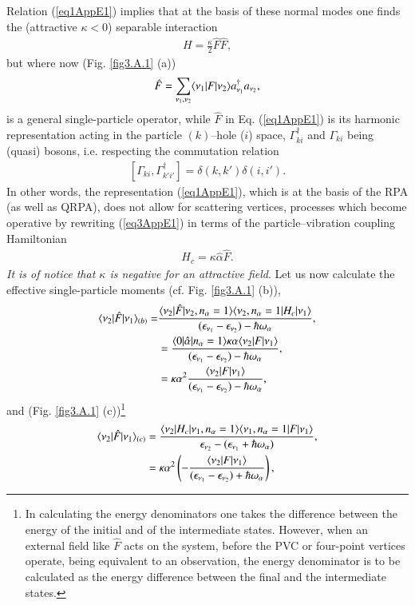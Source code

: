 Relation (\ref{eq1AppE1}) implies that at the basis of these normal modes one finds the (attractive $\kappa<0$) separable interaction 
\begin{align}\label{eq3AppE1}
H=\frac{\kappa}{2}\hat F\hat F,
\end{align}
but where now (Fig. \ref{fig3.A.1} (a))
\begin{align}
\hat F=\sum_{\nu_1,\nu_2} \langle {\nu_1|F|\nu_2} \rangle a^\dagger_{\nu_1}a_{\nu_2},
\end{align}
is a general single-particle operator, while $\hat F$ in  Eq. (\ref{eq1AppE1}) is its harmonic representation acting in the particle $(k)$--hole ($i$) space, $\Gamma^\dagger_{ki}$ and $\Gamma_{ki}$ being (quasi) bosons, i.e. respecting the commutation relation 
\begin{align}
\left[\Gamma_{ki},\Gamma^\dagger_{k'i'}\right]=\delta(k,k')\delta(i,i').
\end{align}
In other words, the representation (\ref{eq1AppE1}), which is at the basis of the RPA (as well as QRPA), does not allow for scattering vertices, processes which become operative by rewriting (\ref{eq3AppE1}) in terms of the particle--vibration coupling Hamiltonian
\begin{align}\label{eq3AppE4}
H_c=\kappa\hat \alpha\hat F.
\end{align}
\emph{It is of notice that $\kappa$ is negative for an attractive field}. Let us now calculate the effective single-particle moments (cf. Fig. \ref{fig3.A.1} (b)),
\begin{align}
\nonumber \langle {\nu_2|\hat F|\nu_1} \rangle_{(b)}=&\frac{\langle {\nu_2|\hat F|\nu_2,n_\alpha=1} \rangle\langle {\nu_2,n_\alpha=1|H_c|\nu_1} \rangle}{(\epsilon_{\nu_1}-\epsilon_{\nu_2})-\hbar\omega_\alpha},\\
\nonumber &=\frac{\langle {0|\hat \alpha|n_\alpha=1} \rangle\kappa\alpha \langle {\nu_2|F|\nu_1} \rangle}{(\epsilon_{\nu_1}-\epsilon_{\nu_2})-\hbar\omega_\alpha},\\
&=\kappa\alpha^2\frac{ \langle {\nu_2|F|\nu_1} \rangle}{(\epsilon_{\nu_1}-\epsilon_{\nu_2})-\hbar\omega_\alpha},
\end{align}
and (Fig. \ref{fig3.A.1} (c))\footnote{In calculating the energy denominators one takes the difference between the energy of the initial and of the intermediate states. However, when an external field like $\hat F$ acts on the system, before the PVC or four-point vertices operate, being equivalent to an observation, the energy denominator is to be calculated as the energy difference between the final and the intermediate states. }
\begin{align}\label{eq8App1E}
\nonumber \langle {\nu_2|\hat F|\nu_1} \rangle_{(c)}&=\frac{\langle {\nu_2|H_c|\nu_1,n_\alpha=1} \rangle\langle {\nu_1,n_\alpha=1| F|\nu_1} \rangle}{\epsilon_{\nu_2}-(\epsilon_{\nu_1}+\hbar\omega_\alpha)},\\
&=\kappa\alpha^2\left(-\frac{\langle {\nu_2|F|\nu_1} \rangle}{(\epsilon_{\nu_1}-\epsilon_{\nu_2})+\hbar\omega_\alpha}\right),
\end{align}
